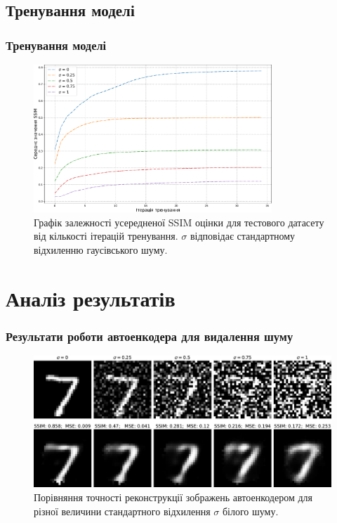 \documentclass{beamer}
\newcounter{e}
\begin{document}
	\subsection{Тренування моделі}
	\begin{frame}
		\frametitle{Тренування моделі}
		
		\begin{figure}[H]
			\centering
			\includegraphics[width=0.8\textwidth]{../resources/awgn-train-ssim-comparation.pdf}
			\caption{Графік залежності усередненої SSIM оцінки для тестового датасету від кількості ітерацій тренування. $\sigma$ відповідає стандартному відхиленню гаусівського шуму.}
			\label{fig:awgn-train-ssim-comparation}
		\end{figure}
	\end{frame}

	\section{Аналіз результатів}
		
	\begin{frame}
		\frametitle{Результати роботи автоенкодера для видалення шуму}
		
		\begin{figure}[H]
			\centering
			\includegraphics[width=1\textwidth]{../resources/denoising-awgn-comparation.pdf}
			\caption{Порівняння точності реконструкції зображень автоенкодером для різної величини стандартного відхилення $\sigma$ білого шуму.}
			\label{fig:denoising-awgn-comparation}
		\end{figure}
	\end{frame}
\end{document}
